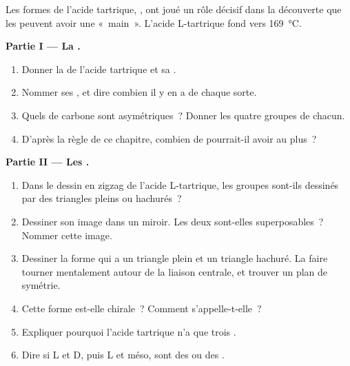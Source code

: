 \begin{problem}
\label{pb:g12:stereochemistry:1}
Les formes de l'acide tartrique, , ont joué
un rôle décisif dans la découverte que les  peuvent avoir une «~main~». L'acide L-tartrique fond vers \qty{169}{\celsius}.

\medskip
\noindent\textbf{Partie I --- La .}
\begin{enumerate}
  \item Donner la  de l'acide tartrique et sa .
  \item Nommer ses , et dire combien il y en a
        de chaque sorte.
  \item Quels  de carbone sont asymétriques~? Donner les quatre
        groupes de chacun.
  \item D'après la règle de ce chapitre, combien de 
        pourrait-il avoir au plus~?
\end{enumerate}

\medskip
\noindent\textbf{Partie II --- Les .}
\begin{enumerate}[resume]
  \item Dans le dessin en zigzag de l'acide L-tartrique, les groupes
         sont-ils dessinés par des triangles pleins ou hachurés~?
  \item Dessiner son image dans un miroir. Les deux sont-elles
        superposables~? Nommer cette image.
  \item Dessiner la forme qui a un triangle plein et un triangle hachuré.
        La faire tourner mentalement autour de la liaison centrale, et
        trouver un plan de symétrie.
  \item Cette forme est-elle chirale~? Comment s'appelle-t-elle~?
  \item Expliquer pourquoi l'acide tartrique n'a que trois
        .
  \item Dire si L et D, puis L et méso, sont des  ou des
        .
\end{enumerate}


\end{problem}
